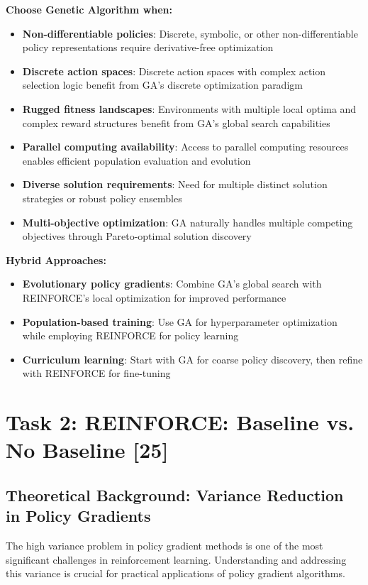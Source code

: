 \documentclass[12pt]{article}
\begin{document}
{{{\textbf{Choose Genetic Algorithm when:}
\begin{itemize}
    \item \textbf{Non-differentiable policies}: Discrete, symbolic, or other non-differentiable policy representations require derivative-free optimization
    \item \textbf{Discrete action spaces}: Discrete action spaces with complex action selection logic benefit from GA's discrete optimization paradigm
    \item \textbf{Rugged fitness landscapes}: Environments with multiple local optima and complex reward structures benefit from GA's global search capabilities
    \item \textbf{Parallel computing availability}: Access to parallel computing resources enables efficient population evaluation and evolution
    \item \textbf{Diverse solution requirements}: Need for multiple distinct solution strategies or robust policy ensembles
    \item \textbf{Multi-objective optimization}: GA naturally handles multiple competing objectives through Pareto-optimal solution discovery
\end{itemize}

\textbf{Hybrid Approaches:}
\begin{itemize}
    \item \textbf{Evolutionary policy gradients}: Combine GA's global search with REINFORCE's local optimization for improved performance
    \item \textbf{Population-based training}: Use GA for hyperparameter optimization while employing REINFORCE for policy learning
    \item \textbf{Curriculum learning}: Start with GA for coarse policy discovery, then refine with REINFORCE for fine-tuning
\end{itemize} 

\newpage

\section{Task 2: REINFORCE: Baseline vs. No Baseline [25]}

\subsection{Theoretical Background: Variance Reduction in Policy Gradients}

The high variance problem in policy gradient methods is one of the most significant challenges in reinforcement learning. Understanding and addressing this variance is crucial for practical applications of policy gradient algorithms.

}}}
\end{document}
